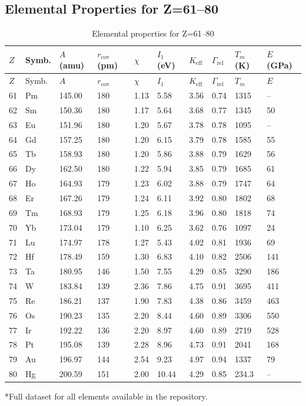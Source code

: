 \documentclass[12pt,a4paper]{article}
\newcommand{\Keff}{K_{\mathrm{eff}}}
\begin{document}
	\subsection*{Elemental Properties for Z=61–80}
	
	\begin{longtable}{p{0.6cm}p{1.2cm}p{1.2cm}p{1.2cm}p{1.2cm}p{1.2cm}p{1.5cm}p{1.2cm}p{1.2cm}p{1.2cm}}
		\caption{Elemental properties for Z=61–80} \label{tab:elem-data-61to80} \\
		\toprule
		\(Z\) & Symb. & \(A\) (amu) & \(r_{\text{cov}}\) (pm) & \(\chi\) & \(I_1\) (eV) & \(\Keff\) & \(\Gamma_{\text{rel}}\) & \(T_m\) (K) & \(E\) (GPa) \\
		\midrule
		\endfirsthead
		\toprule
		\(Z\) & Symb. & \(A\) & \(r_{\text{cov}}\) & \(\chi\) & \(I_1\) & \(\Keff\) & \(\Gamma_{\text{rel}}\) & \(T_m\) & \(E\) \\
		\midrule
		\endhead
		61 & Pm & 145.00 & 180 & 1.13 & 5.58 & 3.56 & 0.74 & 1315 & – \\
		62 & Sm & 150.36 & 180 & 1.17 & 5.64 & 3.68 & 0.77 & 1345 & 50 \\
		63 & Eu & 151.96 & 180 & 1.20 & 5.67 & 3.78 & 0.78 & 1095 & – \\
		64 & Gd & 157.25 & 180 & 1.20 & 6.15 & 3.79 & 0.78 & 1585 & 55 \\
		65 & Tb & 158.93 & 180 & 1.20 & 5.86 & 3.88 & 0.79 & 1629 & 56 \\
		66 & Dy & 162.50 & 180 & 1.22 & 5.94 & 3.85 & 0.79 & 1685 & 61 \\
		67 & Ho & 164.93 & 179 & 1.23 & 6.02 & 3.88 & 0.79 & 1747 & 64 \\
		68 & Er & 167.26 & 179 & 1.24 & 6.11 & 3.92 & 0.80 & 1802 & 68 \\
		69 & Tm & 168.93 & 179 & 1.25 & 6.18 & 3.96 & 0.80 & 1818 & 74 \\
		70 & Yb & 173.04 & 179 & 1.10 & 6.25 & 3.62 & 0.76 & 1097 & 24 \\
		71 & Lu & 174.97 & 178 & 1.27 & 5.43 & 4.02 & 0.81 & 1936 & 69 \\
		72 & Hf & 178.49 & 159 & 1.30 & 6.83 & 4.10 & 0.82 & 2506 & 141 \\
		73 & Ta & 180.95 & 146 & 1.50 & 7.55 & 4.29 & 0.85 & 3290 & 186 \\
		74 & W  & 183.84 & 139 & 2.36 & 7.86 & 4.75 & 0.91 & 3695 & 411 \\
		75 & Re & 186.21 & 137 & 1.90 & 7.83 & 4.38 & 0.86 & 3459 & 463 \\
		76 & Os & 190.23 & 135 & 2.20 & 8.44 & 4.60 & 0.89 & 3306 & 550 \\
		77 & Ir & 192.22 & 136 & 2.20 & 8.97 & 4.60 & 0.89 & 2719 & 528 \\
		78 & Pt & 195.08 & 139 & 2.28 & 8.96 & 4.73 & 0.91 & 2041 & 168 \\
		79 & Au & 196.97 & 144 & 2.54 & 9.23 & 4.97 & 0.94 & 1337 & 79 \\
		80 & Hg & 200.59 & 151 & 2.00 & 10.44 & 4.29 & 0.85 & 234.3 & – \\
		\bottomrule
	\end{longtable}
	*Full dataset for all elements available in the repository.
	
\end{document}

